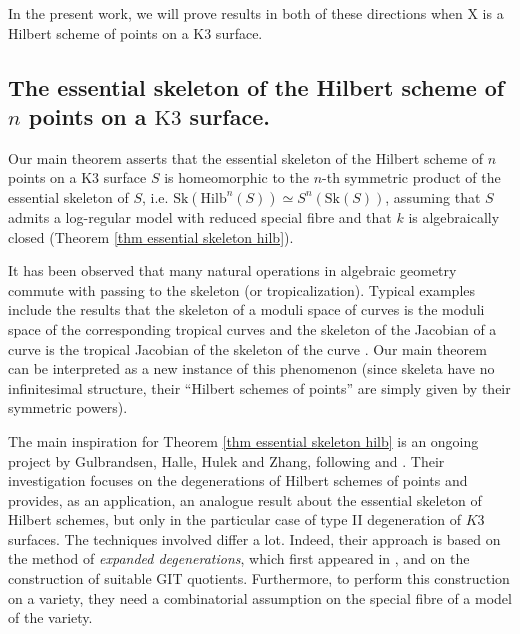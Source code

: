 \documentclass{amsart}%
\numberwithin{equation}{subsection}
\theoremstyle{plain2}
\theoremstyle{definition2}
\theoremstyle{stepstyle}
\theoremstyle{point}
\theoremstyle{subpoint}
\newcommand{\Hilb}{\ensuremath{\mathrm{Hilb}}}
\newcommand{\Sk}{\mathrm{Sk}}
\begin{document}
In the present work, we will prove results in both of these directions when X is a Hilbert scheme of points on a $\text{K}3$ surface.

\subsection{The essential skeleton of the Hilbert scheme of $n$ points on a $\text{K3}$ surface.} Our main theorem asserts that the essential skeleton of the Hilbert scheme of $n$ points on a $\text{K}3$ surface $S$ is homeomorphic to the $n$-th symmetric product of the essential skeleton of $S$, i.e. $\Sk(\Hilb^n(S)) \simeq S^n(\Sk(S))$, assuming that $S$ admits a log-regular model with reduced special fibre and that $k$ is algebraically closed (Theorem \ref{thm essential skeleton hilb}).

It has been observed that many natural operations in algebraic geometry commute with passing to the skeleton (or tropicalization). Typical examples include the results that the skeleton of a moduli space of curves is the moduli space of the corresponding tropical curves \cite{AbramovichCaporasoPayne} and the skeleton of the Jacobian of a curve is the tropical Jacobian of the skeleton of the curve \cite{BakerRabinoff}. Our main theorem can be interpreted as a new instance of this phenomenon (since skeleta have no infinitesimal structure, their ``Hilbert schemes of points'' are simply given by their symmetric powers). 

The main inspiration for Theorem \ref{thm essential skeleton hilb} is an ongoing project by Gulbrandsen, Halle, Hulek and Zhang, following \cite{GulbrandsenHalleHulek} and \cite{GulbrandsenHalleHulek2016}. Their investigation focuses on the degenerations of Hilbert schemes of points and provides, as an application, an analogue result about the essential skeleton of Hilbert schemes, but only in the particular case of type II degeneration of $K3$ surfaces. The techniques involved differ a lot. Indeed, their approach is based on the method of \textit{expanded degenerations}, which first appeared in \cite{Li}, and on the construction of suitable GIT quotients. Furthermore, to perform this construction on a variety, they need a combinatorial assumption on the special fibre of a model of the variety.
\end{document}

